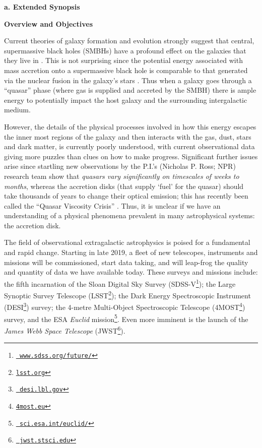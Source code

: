 \documentclass[oneside, a4paper, onecolumn, 11pt]{article}
\begin{document}
\smallskip
\smallskip
\noindent
{\bf{\textcolor{Cerulean}{a. Extended Synopsis}}} 
\vspace{6pt}

\noindent
\large
{\bf{\textcolor{Cerulean}{Overview and Objectives}}}
\normalsize

\smallskip
\noindent
Current theories of galaxy formation and evolution strongly suggest
that central, supermassive black holes (SMBHs) have a profound effect
on the galaxies that they live in \citep{Vogelsberger2014Nature,
Schaye2015, SomervilleDave2015,Dave2017}.  This is not surprising
since the potential energy associated with mass accretion onto a
supermassive black hole is comparable to that generated via the
nuclear fusion in the galaxy's stars \citep[see
e.g. ][]{Fabian2012}. Thus when a galaxy goes through a ``quasar''
phase (where gas is supplied and accreted by the SMBH) there is ample
energy to potentially impact the host galaxy and the surrounding
intergalactic medium.

\smallskip
\smallskip
\noindent
However, the details of the physical processes involved in how this
energy escapes the inner most regions of the galaxy and then interacts
with the gas, dust, stars and dark matter, is currently poorly
understood, with current observational data giving more puzzles than
clues on how to make progress. Significant further issues arise since
startling new observations by the P.I.’s (Nicholas P. Ross; NPR)
research team \citep{MacLeod2016, Ross2018} show that {\it quasars
vary significantly on timescales of weeks to months}, whereas the
accretion disks (that supply `fuel' for the quasar) should take
thousands of years to change their optical emission; this has recently
been called the ``Quasar Viscosity Crisis'' \citep[e.g.,
][]{Lawrence2018}. Thus, it is unclear if we have an understanding of
a physical phenomena prevalent in many astrophysical systems: the
accretion disk.

\smallskip
\smallskip
\noindent
The field of observational extragalactic astrophysics is poised for a
fundamental and rapid change. Starting in late 2019, a fleet of new
telescopes, instruments and missions will be commissioned, start data
taking, and will leap-frog the quality and quantity of data we have
available today. These surveys and missions include: the fifth
incarnation of the Sloan Digital Sky Survey
(SDSS-V\footnote{\href{www.sdss.org/future/}{{\tt
www.sdss.org/future/}}}); the Large Synoptic Survey Telescope
(LSST\footnote{\href{lsst.org}{{\tt lsst.org}}}); the Dark Energy
Spectroscopic Instrument (DESI\footnote{\href{desi.lbl.gov}{{\tt
desi.lbl.gov}}}) survey; the 4-metre Multi-Object Spectroscopic
Telescope (4MOST\footnote{\href{4most.eu}{{\tt 4most.eu}}}) survey,
and the ESA {\it Euclid}
mission\footnote{\href{sci.esa.int/euclid/}{{\tt
sci.esa.int/euclid/}}}. Even more imminent is the launch of the {\it
James Webb Space Telescope} (JWST\footnote{\href{jwst.stsci.edu}{{\tt
jwst.stsci.edu}}}).
\end{document}
